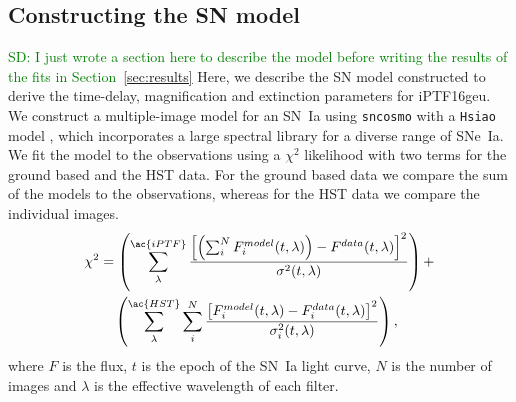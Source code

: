 \documentclass[a4paper,fleqn,usenatbib]{mnras}
\newcommand{\sd}[1]{\textcolor{green}{SD: #1}}
\begin{document}
\subsection{Constructing the SN model}
\sd{I just wrote a section here to describe the model before writing the results of the fits in Section~\ref{sec:results}}
Here, we describe the SN model constructed to derive the time-delay, magnification and extinction parameters for iPTF16geu. We construct a multiple-image model for an SN~Ia using \texttt{sncosmo} with a \texttt{Hsiao} model \citep{2007ApJ...663.1187H}, which incorporates a large spectral library for a diverse range of SNe~Ia. 
  We fit the model to the observations using a $\chi^2$ likelihood with two terms for the ground based and the HST data. For the ground based data we compare the sum of the models to the observations, whereas for the HST data we compare the individual images. 
\begin{equation}
\label{eq:chi}
\begin{aligned}
\chi ^2 &= \left(\sum_{\lambda}^{\ac{iPTF}}\frac{\left[\left(\sum_i^{N} F_i^{model}(t,\lambda)\right)-F^{data}(t,\lambda)\right]^2}{\sigma^2(t,\lambda)}\right)+ \\
&\quad \left(\sum_{\lambda}^{\ac{HST}}\sum_i^{N}\frac{\left[F_i^{model}(t,\lambda)-F_i^{data}(t,\lambda)\right]^2}{\sigma_i^2(t,\lambda)}\right),
\end{aligned}
\end{equation}
where $F$ is the flux, $t$ is the epoch of the SN~Ia light curve, $N$ is the number of images and $\lambda$ is the effective wavelength of each filter. 
\end{document}
